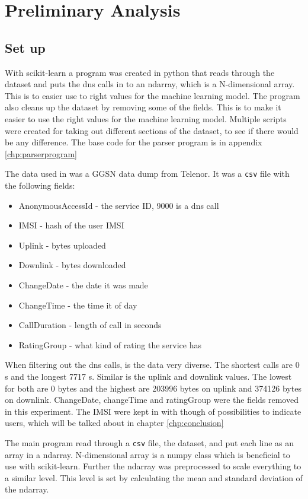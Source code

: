 \chapter{Preliminary Analysis}
\label{chp:results}

\section{Set up}
With scikit-learn a program was created in python that reads through the dataset and puts the \gls{dns} calls in to an ndarray, which is a N-dimensional array. This is to easier use to right values for the machine learning model. The program also cleans up the dataset by removing some of the fields. This is to make it easier to use the right values for the machine learning model. Multiple scripts were created for taking out different sections of the dataset, to see if there would be any difference. The base code for the parser program is in appendix \ref{chp:parserprogram}

The data used in was a GGSN data dump from Telenor. It was a \texttt{csv} file with the following fields:
\begin{itemize}
\item AnonymousAccessId - the service ID, 9000 is a \gls{dns} call
\item IMSI - hash of the user IMSI
\item Uplink - bytes uploaded
\item Downlink - bytes downloaded
\item ChangeDate - the date it was made
\item ChangeTime - the time it of day
\item CallDuration - length of call in seconds
\item RatingGroup - what kind of rating the service has
\end{itemize}

When filtering out the \gls{dns} calls, is the data very diverse. The shortest calls are 0 s and the longest 7717 s. Similar is the uplink and downlink values. The lowest for both are 0 bytes and the highest are 203996 bytes on uplink and 374126 bytes on downlink. ChangeDate, changeTime and ratingGroup were the fields removed in this experiment. The IMSI were kept in with though of possibilities to indicate users, which will be talked about in chapter \ref{chp:conclusion}

The main program read through a \texttt{csv} file, the dataset, and put each line as an array in a ndarray. N-dimensional array is a numpy class which is beneficial to use with scikit-learn. Further the ndarray was preprocessed to scale everything to a similar level. This level is set by calculating the mean and standard deviation of the ndarray. 

